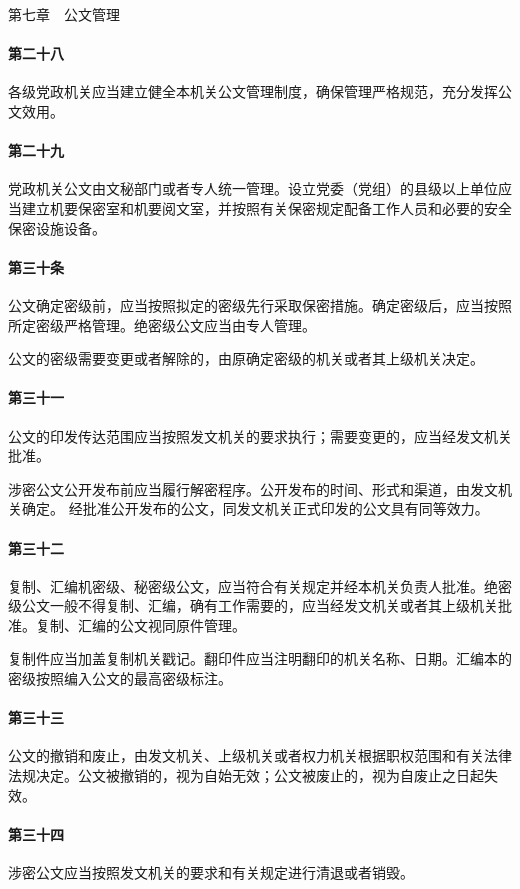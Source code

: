 \documentclass{gbt9704}
\begin{document}
第七章　公文管理


\paragraph{第二十八}各级党政机关应当建立健全本机关公文管理制度，确保管理严格规范，充分发挥公文效用。

\paragraph{第二十九}党政机关公文由文秘部门或者专人统一管理。设立党委（党组）的县级以上单位应当建立机要保密室和机要阅文室，并按照有关保密规定配备工作人员和必要的安全保密设施设备。

\paragraph{第三十条}
公文确定密级前，应当按照拟定的密级先行采取保密措施。确定密级后，应当按照所定密级严格管理。绝密级公文应当由专人管理。

公文的密级需要变更或者解除的，由原确定密级的机关或者其上级机关决定。
\paragraph{第三十一}公文的印发传达范围应当按照发文机关的要求执行；需要变更的，应当经发文机关批准。

涉密公文公开发布前应当履行解密程序。公开发布的时间、形式和渠道，由发文机关确定。
经批准公开发布的公文，同发文机关正式印发的公文具有同等效力。
\paragraph{第三十二}复制、汇编机密级、秘密级公文，应当符合有关规定并经本机关负责人批准。绝密级公文一般不得复制、汇编，确有工作需要的，应当经发文机关或者其上级机关批准。复制、汇编的公文视同原件管理。

复制件应当加盖复制机关戳记。翻印件应当注明翻印的机关名称、日期。汇编本的密级按照编入公文的最高密级标注。
\paragraph{第三十三}公文的撤销和废止，由发文机关、上级机关或者权力机关根据职权范围和有关法律法规决定。公文被撤销的，视为自始无效；公文被废止的，视为自废止之日起失效。

\paragraph{第三十四}涉密公文应当按照发文机关的要求和有关规定进行清退或者销毁。
\end{document}
